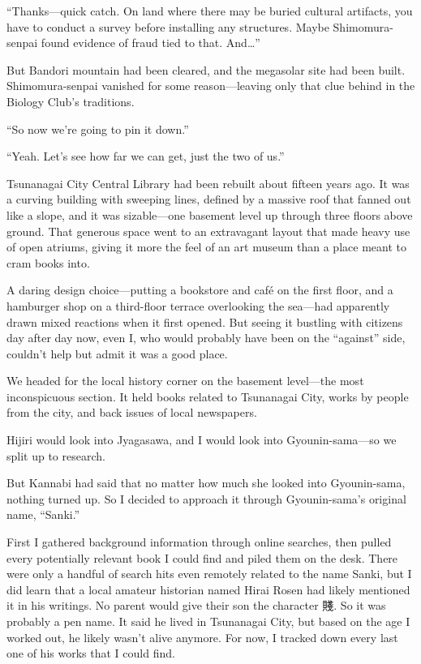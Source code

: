 \documentclass[
    a4paper,
    12pt,
    twoside,
    openany,
    UTF8,
    fontset=windows
]{ctexbook}
\begin{document}
``Thanks---quick catch. On land where there may be buried cultural artifacts, you have to conduct a survey before installing any structures. Maybe Shimomura-senpai found evidence of fraud tied to that. And\dots''

But Bandori mountain had been cleared, and the megasolar site had been built. Shimomura-senpai vanished for some reason---leaving only that clue behind in the Biology Club's traditions.

``So now we're going to pin it down.''

``Yeah. Let's see how far we can get, just the two of us.''

Tsunanagai City Central Library had been rebuilt about fifteen years ago. It was a curving building with sweeping lines, defined by a massive roof that fanned out like a slope, and it was sizable---one basement level up through three floors above ground. That generous space went to an extravagant layout that made heavy use of open atriums, giving it more the feel of an art museum than a place meant to cram books into.

A daring design choice---putting a bookstore and café on the first floor, and a hamburger shop on a third-floor terrace overlooking the sea---had apparently drawn mixed reactions when it first opened. But seeing it bustling with citizens day after day now, even I, who would probably have been on the ``against'' side, couldn't help but admit it was a good place.

We headed for the local history corner on the basement level---the most inconspicuous section. It held books related to Tsunanagai City, works by people from the city, and back issues of local newspapers.

Hijiri would look into Jyagasawa, and I would look into Gyounin-sama---so we split up to research.

But Kannabi had said that no matter how much she looked into Gyounin-sama, nothing turned up. So I decided to approach it through Gyounin-sama's original name, ``Sanki.''

First I gathered background information through online searches, then pulled every potentially relevant book I could find and piled them on the desk. There were only a handful of search hits even remotely related to the name Sanki, but I did learn that a local amateur historian named Hirai Rosen had likely mentioned it in his writings. No parent would give their son the character 賤. So it was probably a pen name. It said he lived in Tsunanagai City, but based on the age I worked out, he likely wasn't alive anymore. For now, I tracked down every last one of his works that I could find.
\end{document}

